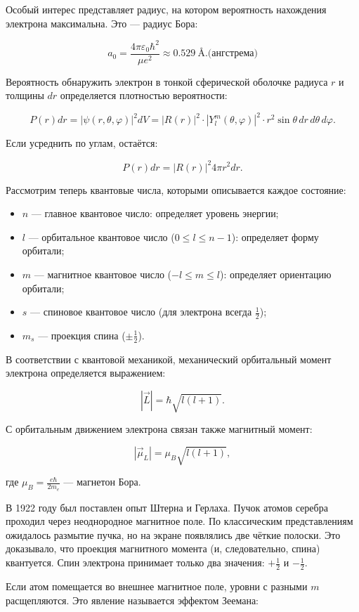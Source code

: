 \documentclass[12pt]{article}
\begin{document}
Особый интерес представляет радиус, на котором вероятность нахождения электрона максимальна. Это — радиус Бора:

$$
a_0 = \frac{4 \pi \varepsilon_0 \hbar^2}{\mu e^2} \approx 0.529~\text{\AA}. \text{(ангстрема)}
$$

Вероятность обнаружить электрон в тонкой сферической оболочке радиуса $r$ и толщины $dr$ определяется плотностью вероятности:

$$
P(r)dr = |\psi(r,\theta,\varphi)|^2 dV = |R(r)|^2 \cdot |Y_l^m(\theta, \varphi)|^2 \cdot r^2 \sin \theta \, dr \, d\theta \, d\varphi.
$$

Если усреднить по углам, остаётся:

$$
P(r) dr = |R(r)|^2 4\pi r^2 dr.
$$

Рассмотрим теперь квантовые числа, которыми описывается каждое состояние:

\begin{itemize}
    \item $n$ — главное квантовое число: определяет уровень энергии;
    \item $l$ — орбитальное квантовое число ($0 \le l \le n - 1$): определяет форму орбитали;
    \item $m$ — магнитное квантовое число ($-l \le m \le l$): определяет ориентацию орбитали;
    \item $s$ — спиновое квантовое число (для электрона всегда $\frac{1}{2}$);
    \item $m_s$ — проекция спина ($\pm\frac{1}{2}$).
\end{itemize}

В соответствии с квантовой механикой, механический орбитальный момент электрона определяется выражением:

$$
|\vec{L}| = \hbar \sqrt{l(l+1)}.
$$

С орбитальным движением электрона связан также магнитный момент:

$$
|\vec{\mu}_L| = \mu_B \sqrt{l(l+1)},
$$

где $\mu_B = \frac{e\hbar}{2m_e}$ — магнетон Бора.

В 1922 году был поставлен опыт Штерна и Герлаха. Пучок атомов серебра проходил через неоднородное магнитное поле. По классическим представлениям ожидалось размытие пучка, но на экране появлялись две чёткие полоски. Это доказывало, что проекция магнитного момента (и, следовательно, спина) квантуется. Спин электрона принимает только два значения: $+\frac{1}{2}$ и $-\frac{1}{2}$.

Если атом помещается во внешнее магнитное поле, уровни с разными $m$ расщепляются. Это явление называется эффектом Зеемана:
\end{document}
